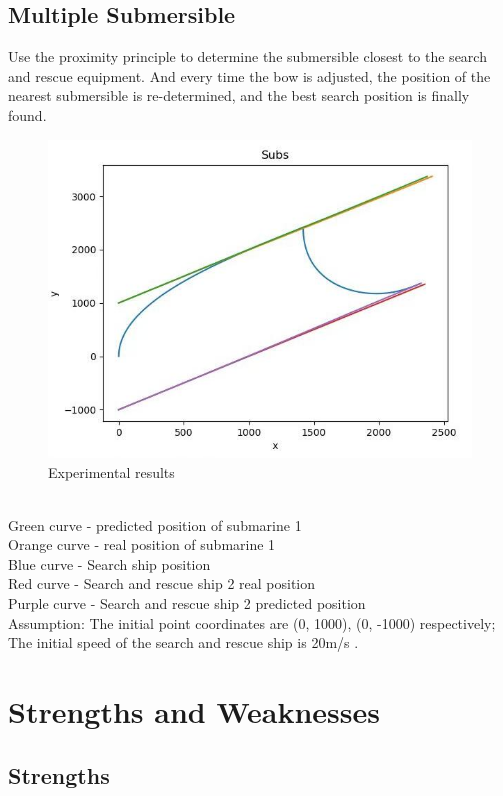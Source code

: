 \documentclass[12pt]{article}  %
\begin{document}
\subsection{Multiple Submersible}
\indent Use the proximity principle to determine the submersible closest to the search and rescue equipment. And every time the bow is adjusted, the position of the nearest submersible is re-determined, and the best search position is finally found.\\
\begin{figure}[htbp]  %
    \centering  %
    \includegraphics[width=.7\textwidth]{mul.jpg} %
    \caption{Experimental results} %
    \end{figure}
    \vspace{-0.8cm}
    \indent \\
\indent Green curve - predicted position of submarine 1\\
\indent Orange curve - real position of submarine 1\\
\indent Blue curve - Search ship position \\
\indent Red curve - Search and rescue ship 2 real position \\
\indent Purple curve - Search and rescue ship 2 predicted position \\
\indent Assumption: The initial point coordinates are (0, 1000), (0, -1000) respectively; The initial speed of the search and rescue ship is 20m/s
.


\section{Strengths and Weaknesses}
\subsection{Strengths}
\end{document}
